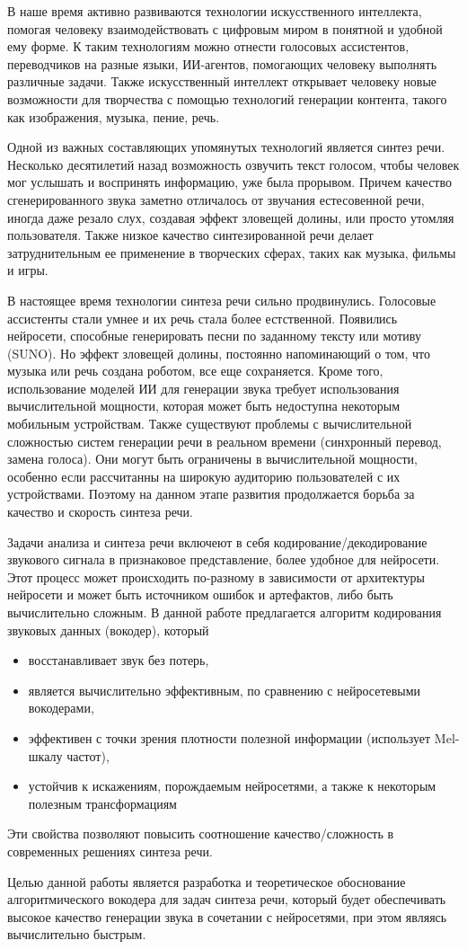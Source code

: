 \Introduction

В наше время активно развиваются технологии искусственного интеллекта, помогая человеку взаимодействовать с цифровым миром в понятной и удобной ему форме. 
К таким технологиям можно отнести голосовых ассистентов, переводчиков на разные языки, ИИ-агентов, помогающих человеку выполнять различные задачи.
Также искусственный интеллект открывает человеку новые возможности для творчества с помощью технологий генерации контента, такого как изображения, музыка, пение, речь.

Одной из важных составляющих упомянутых технологий является синтез речи. 
Несколько десятилетий назад возможность озвучить текст голосом, чтобы человек мог услышать и воспринять информацию, уже была прорывом. 
Причем качество сгенерированного звука заметно отличалось от звучания естесовенной речи, иногда даже резало слух, создавая эффект зловещей долины, или просто утомляя пользователя.
Также низкое качество синтезированной речи делает затруднительным ее применение в творческих сферах, таких как музыка, фильмы и игры.

В настоящее время технологии синтеза речи сильно продвинулись. Голосовые ассистенты стали умнее и их речь стала более естственной. 
Появились нейросети, способные генерировать песни по заданному тексту или мотиву (SUNO). 
Но эффект зловещей долины, постоянно напоминающий о том, что музыка или речь создана роботом, все еще сохраняется.
Кроме того, использование моделей ИИ для генерации звука требует использования вычислительной мощности, которая может быть недоступна некоторым мобильным устройствам.
Также существуют проблемы с вычислительной сложностью систем генерации речи в реальном времени (синхронный перевод, замена голоса). 
Они могут быть ограничены в вычислительной мощности, особенно если рассчитанны на широкую аудиторию пользователей с их устройствами.
Поэтому на данном этапе развития продолжается борьба за качество и скорость синтеза речи.

Задачи анализа и синтеза речи включеют в себя кодирование/декодирование звукового сигнала в признаковое представление, более удобное для нейросети.
Этот процесс может происходить по-разному в зависимости от архитектуры нейросети и может быть источником ошибок и артефактов, либо быть вычислительно сложным.
В данной работе предлагается алгоритм кодирования звуковых данных (вокодер), который 
\begin{itemize}
    \item восстанавливает звук без потерь, 
    \item является вычислительно эффективным, по сравнению с нейросетевыми вокодерами,
    \item эффективен с точки зрения плотности полезной информации (использует Mel-шкалу частот),
    \item устойчив к искажениям, порождаемым нейросетями, а также к некоторым полезным трансформациям
\end{itemize}
Эти свойства позволяют повысить соотношение качество/сложность в современных решениях синтеза речи.

Целью данной работы является разработка и теоретическое обоснование алгоритмического вокодера для задач синтеза речи, который будет обеспечивать высокое качество генерации звука в сочетании с нейросетями, при этом являясь вычислительно быстрым.
